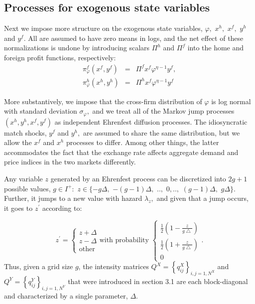 \documentclass[12pt,titlepage]{article}
\begin{document}
\subsection{Processes for exogenous state variables}

Next we impose more structure on the exogenous state variables, $\varphi ,$ $%
x^{h},$ $x^{f},$ $y^{h}$ and $y^{f}.$ All are assumed to have zero means in
logs, and the net effect of these normalizations is undone by introducing
scalars $\Pi ^{h}$ and $\Pi ^{f}$ into the home and foreign profit
functions, respectively:%
\begin{eqnarray*}
\pi _{\varphi }^{f}(x^{f},y^{f}) &=&\Pi ^{f}x^{f}\varphi ^{\eta -1}y^{f}, \\
\pi _{\varphi }^{h}(x^{h},y^{h}) &=&\Pi ^{h}x^{f}\varphi ^{\eta -1}y^{f}
\end{eqnarray*}

More substantively, we impose that the cross-firm distribution of $\varphi $
is log normal with standard deviation $\sigma _{\varphi },$ and we treat all
of the Markov jump processes $(x^{h},y^{h},x^{f},y^{f})$ as independent
Ehrenfest diffusion processes. The idiosyncratic match shocks, $y^{f}$ and $%
y^{h},$ are assumed to share the same distribution, but we allow the $x^{f}$
and $x^{h}$ processes to differ. Among other things, the latter accommodates
the fact that the exchange rate affects aggregate demand and price indices
in the two markets differently.

Any variable $z$ generated by an Ehrenfest process can be discretized into $%
2g+1$ possible values, $g\in I^{+}:$ $z\in \{-g\Delta ,$ $-(g-1)\Delta ,$ $%
..,$ $0,..,$ $(g-1)\Delta ,$ $g\Delta \}.$ Further, it jumps to a new value
with hazard $\lambda _{z},$ and given that a jump occurs, it goes to $%
z^{\prime }$ according to:

\begin{equation*}
z^{\prime }=\left\{ 
\begin{array}{c}
z+\Delta \\ 
z-\Delta \\ 
\text{other}%
\end{array}%
\right. \text{with probability }\left\{ 
\begin{array}{c}
\frac{1}{2}\left( 1-\frac{z}{g\bigtriangleup }\right) \\ 
\frac{1}{2}\left( 1+\frac{z}{g\bigtriangleup }\right) \\ 
0%
\end{array}%
\right. .
\end{equation*}%
Thus, given a grid size $g$, the intensity matrices $Q^{X}=\left\{
q_{ij}^{X}\right\} _{i,j=1,N^{X}}$ and $Q^{Y}=\left\{ q_{ij}^{Y}\right\}
_{i,j=1,N^{Y}}$ that were introduced in section 3.1 are each block-diagonal
and characterized by a single parameter, $\Delta $.
\end{document}
